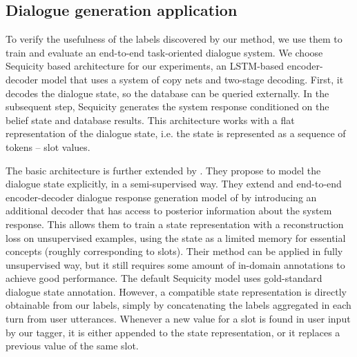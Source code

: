 
\subsection{Dialogue generation application}
To verify the usefulness of the labels discovered by our method, we use them to train and evaluate an end-to-end task-oriented dialogue system.
We choose Sequicity \cite{lei2018sequicity} based architecture for our experiments, an LSTM-based encoder-decoder model that uses a system of copy nets and two-stage decoding.
First, it decodes the dialogue state, so the database can be queried externally.
In the subsequent step, Sequicity generates the system response conditioned on the belief state and database results.
This architecture works with a flat representation of the dialogue state, i.e. the state is represented as a sequence of tokens -- slot values.

The basic architecture is further extended by \citet{jin2018explicit}.
They propose to model the dialogue state explicitly, in a semi-supervised way.
They extend and end-to-end encoder-decoder dialogue response generation model of \citet{lei2018sequicity} by introducing an additional decoder that has access to posterior information about the system response.
This allows them to train a state representation with a reconstruction loss on unsupervised examples, using the state as a limited memory for essential concepts (roughly corresponding to slots).
Their method can be applied in fully unsupervised way, but it still requires some amount of in-domain annotations to achieve good performance.
The default Sequicity model uses gold-standard dialogue state annotation. However, a compatible state representation is directly obtainable from our labels, simply by concatenating the labels aggregated in each turn from user utterances. Whenever a new value for a slot is found in user input by our tagger, it is either appended to the state representation, or it replaces a previous value of the same slot.

